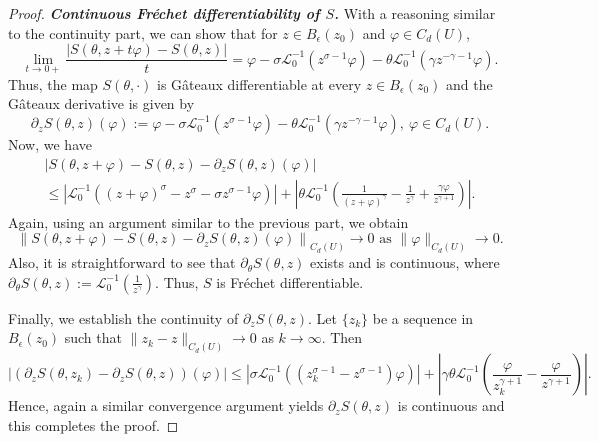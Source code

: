 \documentclass[10pt,a4paper]{amsart}
\newcommand{\ball}{B_{\epsilon} (z_0)}
\newcommand{\li}{\mathcal{L}_0^{-1}}
\newcommand{\pa}{\partial}
\newcommand{\rar}{\rightarrow}
\newcommand{\si}{\sigma}
\begin{document}
\begin{proof}
    \noindent\textit{\textbf{Continuous Fr\'echet differentiability of $S$.}} With a reasoning similar to the continuity part, we can show that for $z\in \ball$ and $\varphi \in C_d (U)$,
    \[\lim_{t\rar 0+} \frac{|S(\theta, z + t \varphi) - S(\theta, z)|}{t} = \varphi - \si \li \left(z^{\si -1} \varphi \right) - \theta \li \left(\gamma z^{-\gamma -1} \varphi \right). \]
    Thus, the map $S(\theta, \cdot)$ is G\^ateaux differentiable at every $z\in \ball$ and the G\^ateaux derivative is given by
    \[\pa_z S(\theta, z)(\varphi):= \varphi - \si \li \left(z^{\si -1} \varphi \right) - \theta \li \left(\gamma z^{-\gamma -1} \varphi \right),\ \varphi \in C_d (U). \]
    Now, we have
    \begin{multline}\label{Frechet 1}
        |S(\theta, z+\varphi) - S(\theta, z) - \pa_z S(\theta, z)(\varphi)|\nonumber\\
        \leq \left|\li \left( (z+\varphi)^{\si} - z^{\si} - \si z^{\si -1} \varphi \right)\right| + \left| \theta \li \left( \frac{1}{(z+\varphi)^{\gamma}} - \frac{1}{z^{\gamma}} + \frac{\gamma \varphi}{z^{\gamma +1}} \right) \right|.
    \end{multline}
     Again, using an argument similar to the previous part, we obtain
     \[ \left\|S(\theta, z+\varphi) - S(\theta, z) - \pa_z S(\theta, z)(\varphi)\right\|_{C_d (U)} \rar 0 \text{ as } \|\varphi\|_{C_d (U)} \rar 0. \]
     Also, it is straightforward to see that $\pa_{\theta} S(\theta, z) $ exists and is continuous, where $\pa_{\theta} S(\theta, z):= \li \left( \frac{1}{z^{\gamma}} \right) $. Thus, $S$ is Fr\'echet differentiable.
     
     Finally, we establish the continuity of $\pa_z S(\theta, z)$. Let $\{z_k\}$ be a sequence in $\ball$ such that $\| z_k - z \|_{C_d (U)} \rar 0$ as $k\rar\infty$. Then
     \begin{equation}
         \left| \left(\pa_{z} S(\theta, z_k) - \pa_z S(\theta, z) \right) (\varphi) \right| \leq \left| \si \li \left( \left(z_k^{\si -1} - z^{\si -1}\right) \varphi \right) \right| + \left| \gamma \theta \li \left( \frac{\varphi}{z_k^{\gamma +1}} - \frac{\varphi}{z^{\gamma+1}} \right) \right|.
     \end{equation}
     Hence, again a similar convergence argument yields $\pa_z S(\theta, z)$ is continuous and this completes the proof.
\end{proof}
\end{document}
